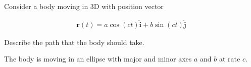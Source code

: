 Consider a body moving in 3D with position vector

\begin{align*}
    \boldsymbol{r}(t) = a\cos(ct) \hat{\boldsymbol{i}} + b \sin(ct) \hat{\boldsymbol{j}}
\end{align*}

Describe the path that the body should take.

\begin{solution}
    The body is moving in an ellipse with major and minor axes $a$ and $b$ at rate $c$.
\end{solution}